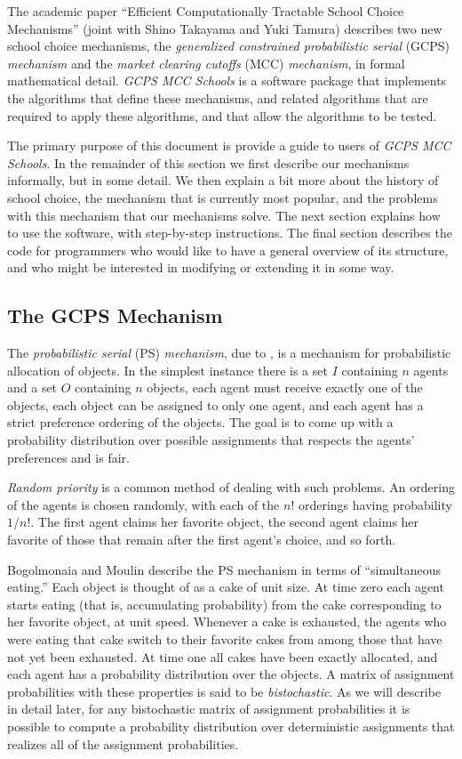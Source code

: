 \documentclass[12pt]{article}
\theoremstyle{definition}
\begin{document}
The academic paper ``Efficient Computationally Tractable School Choice
Mechanisms'' (joint with Shino Takayama and Yuki Tamura) describes two
new school choice mechanisms, the \emph{generalized constrained
probabilistic serial} (GCPS) \emph{mechanism} and the \emph{market
clearing cutoffs} (MCC) \emph{mechanism}, in formal mathematical
detail.  \emph{GCPS MCC Schools} is a software package that implements
the algorithms that define these mechanisms, and related algorithms
that are required to apply these algorithms, and that allow the
algorithms to be tested.

The primary purpose of this document is provide a guide to users of
\emph{GCPS MCC Schools}.  In the remainder of this section we first
describe our mechanisms informally, but in some detail.  We then
explain a bit more about the history of school choice, the mechanism
that is currently most popular, and the problems with this mechanism
that our mechanisms solve.  The next section explains how to use the
software, with step-by-step instructions.  The final section describes
the code for programmers who would like to have a general overview of
its structure, and who might be interested in modifying or extending
it in some way.

\subsection{The GCPS Mechanism}

The \emph{probabilistic serial} (PS) \emph{mechanism}, due to
\cite{bm01}, is a mechanism for probabilistic allocation of objects.
In the simplest instance there is a set $I$ containing $n$ agents and
a set $O$ containing $n$ objects, each agent must receive exactly one
of the objects, each object can be assigned to only one agent, and
each agent has a strict preference ordering of the objects.  The goal
is to come up with a probability distribution over possible
assignments that respects the agents' preferences and is fair.

\emph{Random priority} is a common method of dealing with such
problems.  An ordering of the agents is chosen randomly, with each of
the $n!$ orderings having probability $1/n!$.  The first agent claims
her favorite object, the second agent claims her favorite of those
that remain after the first agent's choice, and so forth.

Bogolmonaia and Moulin describe the PS mechanism in terms of
``simultaneous eating.'' Each object is thought of as a cake of unit
size.  At time zero each agent starts eating (that is, accumulating
probability) from the cake corresponding to her favorite object, at
unit speed.  Whenever a cake is exhausted, the agents who were eating
that cake switch to their favorite cakes from among those that have
not yet been exhausted.  At time one all cakes have been exactly
allocated, and each agent has a probability distribution over the
objects. A matrix of assignment probabilities with these properties is
said to be \emph{bistochastic}. As we will describe in detail later,
for any bistochastic matrix of assignment probabilities it is possible
to compute a probability distribution over deterministic assignments
that realizes all of the assignment probabilities.
\end{document}
